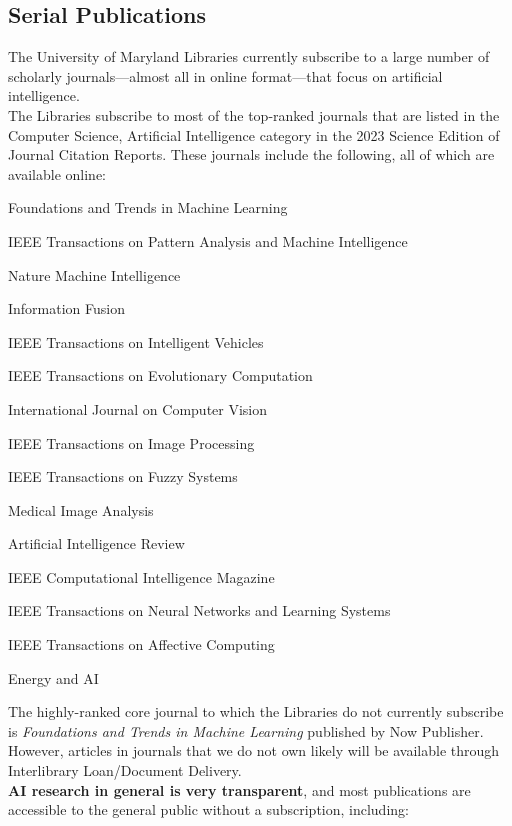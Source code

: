 \subsection*{Serial Publications}
The University of Maryland Libraries currently subscribe to a large number of scholarly journals—almost all in online format—that focus on artificial intelligence.\\
The Libraries subscribe to most of the top-ranked journals that are listed in the Computer Science, Artificial Intelligence category in the 2023 Science Edition of Journal Citation Reports. These journals include the following, all of which are available online:

\begin{itemize*}
    \item Foundations and Trends in Machine Learning
    \item IEEE Transactions on Pattern Analysis and Machine Intelligence
    \item Nature Machine Intelligence
    \item Information Fusion
    \item IEEE Transactions on Intelligent Vehicles
    \item IEEE Transactions on Evolutionary Computation
    \item International Journal on Computer Vision
    \item IEEE Transactions on Image Processing
    \item IEEE Transactions on Fuzzy Systems
    \item Medical Image Analysis
    \item Artificial Intelligence Review
    \item IEEE Computational Intelligence Magazine
    \item IEEE Transactions on Neural Networks and Learning Systems
    \item IEEE Transactions on Affective Computing
    \item Energy and AI
\end{itemize*}

The highly-ranked core journal to which the Libraries do not currently subscribe is \textit{Foundations and Trends in Machine Learning} published by Now Publisher. However, articles in journals that we do not own likely will be available through Interlibrary Loan/Document Delivery.\\
\textbf{AI research in general is very transparent}, and most publications are accessible to the general public without a subscription, including:

